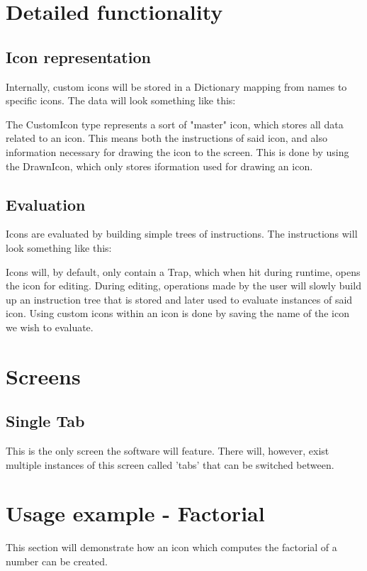 \documentclass{article}
\begin{document}
    \section{Detailed functionality}
        \subsection{Icon representation}
            Internally, custom icons will be stored in a Dictionary mapping from names to specific icons. The data
            will look something like this:
            

            \noindent
            The CustomIcon type represents a sort of "master" icon, which stores all data related to an icon. This
            means both the instructions of said icon, and also information necessary for drawing the icon to the screen.
            This is done by using the DrawnIcon, which only stores iformation used for drawing an icon.

        \subsection{Evaluation}
            Icons are evaluated by building simple trees of instructions. The instructions will look something like
            this:
            

            \noindent
            Icons will, by default, only contain a Trap, which when hit during runtime, opens the icon for editing.
            During editing, operations made by the user will slowly build up an instruction tree that is stored and
            later used to evaluate instances of said icon. Using custom icons within an icon is done by saving the name
            of the icon we wish to evaluate.


    \section{Screens}
        \subsection{Single Tab}
        This is the only screen the software will feature. There will, however, exist multiple instances of this screen
        called 'tabs' that can be switched between.


    \section{Usage example - Factorial}
        This section will demonstrate how an icon which computes the factorial of a number can be created.\\
\end{document}
